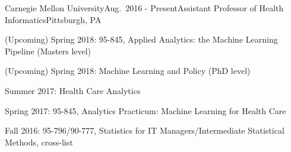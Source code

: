 \begin{rSubsection}{Carnegie Mellon University}{Aug.\ 2016 - Present}{Assistant Professor of Health Informatics}{Pittsburgh, PA}
\item (Upcoming) Spring 2018: 95-845, Applied Analytics: the Machine Learning Pipeline (Masters level)
\item (Upcoming) Spring 2018: Machine Learning and Policy (PhD level)
\item Summer 2017: Health Care Analytics
\item Spring 2017: 95-845, Analytics Practicum: Machine Learning for Health Care
\item Fall 2016: 95-796/90-777, Statistics for IT Managers/Intermediate Statistical Methods, cross-list
\end{rSubsection}







